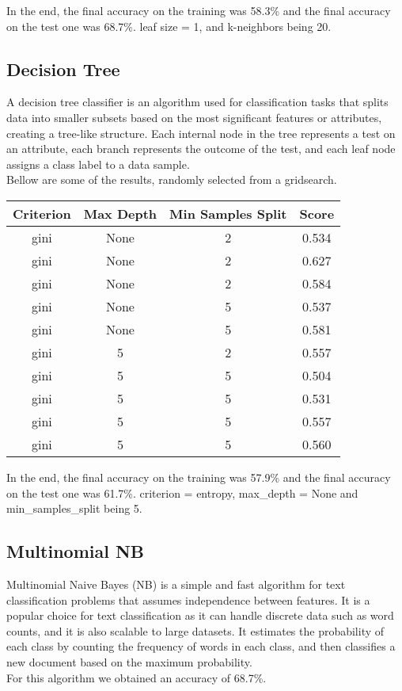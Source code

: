 \documentclass[11pt, a4paper]{article}
\begin{document}
\begin{large}
In the end, the final accuracy on the training  was 58.3\% and the final accuracy on the test one was 68.7\%. leaf size = 1, and k-neighbors being 20.


\subsection{Decision Tree}
A decision tree classifier is an algorithm used for classification tasks that splits data into smaller subsets based on the most significant features or attributes, creating a tree-like structure. Each internal node in the tree represents a test on an attribute, each branch represents the outcome of the test, and each leaf node assigns a class label to a data sample.\\
Bellow are some of the results, randomly selected from a gridsearch.
\begin{table}[H]
\centering
\begin{tabular}{|c|c|c|c|}
\hline
Criterion & Max Depth & Min Samples Split & Score \\ \hline
gini & None & 2 & 0.534 \\ \hline
gini & None & 2 & 0.627 \\ \hline
gini & None & 2 & 0.584 \\ \hline
gini & None & 5 & 0.537 \\ \hline
gini & None & 5 & 0.581 \\ \hline

gini & 5 & 2 & 0.557 \\ \hline
gini & 5 & 5 & 0.504 \\ \hline
gini & 5 & 5 & 0.531 \\ \hline
gini & 5 & 5 & 0.557 \\ \hline
gini & 5 & 5 & 0.560 \\ \hline
\end{tabular}
\end{table}
In the end, the final accuracy on the training was 57.9\% and the final accuracy
on the test one was 61.7\%. criterion =  entropy, max\_depth = None and min\_samples\_split being 5.
\subsection{Multinomial NB}
Multinomial Naive Bayes (NB) is a simple and fast algorithm for text classification problems that assumes independence between features. It is a popular choice for text classification as it can handle discrete data such as word counts, and it is also scalable to large datasets. It estimates the probability of each class by counting the frequency of words in each class, and then classifies a new document based on the maximum probability.\\
For this algorithm we obtained an accuracy of 68.7\%.


\end{large}
\end{document}
